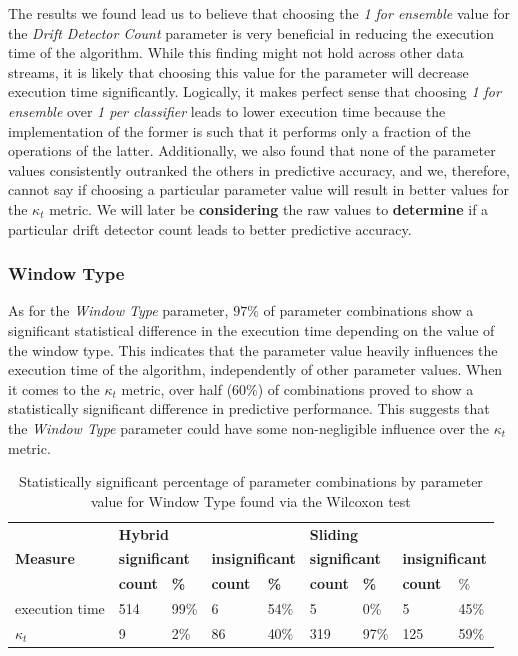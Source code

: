 The results we found lead us to believe that choosing the \textit{1 for ensemble} value for the \textit{Drift Detector Count} parameter is very beneficial in reducing the execution time of the algorithm. While this finding might not hold across other data streams, it is likely that choosing this value for the parameter will decrease execution time significantly. Logically, it makes perfect sense that choosing \textit{1 for ensemble} over \textit{1 per classifier} leads to lower execution time because the implementation of the former is such that it performs only a fraction of the operations of the latter. Additionally, we also found that none of the parameter values consistently outranked the others in predictive accuracy, and we, therefore, cannot say if choosing a particular parameter value will result in better values for the $\kappa_t$ metric. We will later be \textbf{considering} the raw values to \textbf{determine} if a particular drift detector count leads to better predictive accuracy.

\subsubsection{Window Type}
As for the \textit{Window Type} parameter, $97\%$ of parameter combinations show a significant statistical difference in the execution time depending on the value of the window type. This indicates that the parameter value heavily influences the execution time of the algorithm, independently of other parameter values. When it comes to the $\kappa_t$ metric, over half (60\%) of combinations proved to show a statistically significant difference in predictive performance. This suggests that the \textit{Window Type} parameter could have some non-negligible influence over the $\kappa_t$ metric.

\begin{table}[]
\centering
\caption{\label{table:wilcoxon_window_type}Statistically significant percentage of parameter combinations by parameter value for Window Type found via the Wilcoxon test}
\begin{tabular}{|l|l|l|l|l|l|l|l|l|}
\hline
\multirow{3}{*}{\textbf{Measure}} & \multicolumn{4}{l|}{\textbf{Hybrid}} & \multicolumn{4}{l|}{\textbf{Sliding}} \\ \cline{2-9} 
 & \multicolumn{2}{l|}{\textbf{significant}} & \multicolumn{2}{l|}{\textbf{insignificant}} & \multicolumn{2}{l|}{\textbf{significant}} & \multicolumn{2}{l|}{\textbf{insignificant}} \\ \cline{2-9} 
 & \textbf{count} & \textbf{\%} & \textbf{count} & \textbf{\%} & \textbf{count} & \textbf{\%} & \textbf{count} & \% \\ \hline \hhline{=========}
execution time & 514 & 99\% & 6 & 54\% & 5 & 0\% & 5 & 45\% \\ \hline
$\kappa_t$ & 9 & 2\% & 86 & 40\% & 319 & 97\% & 125 & 59\% \\ \hline
\end{tabular}
\end{table}


